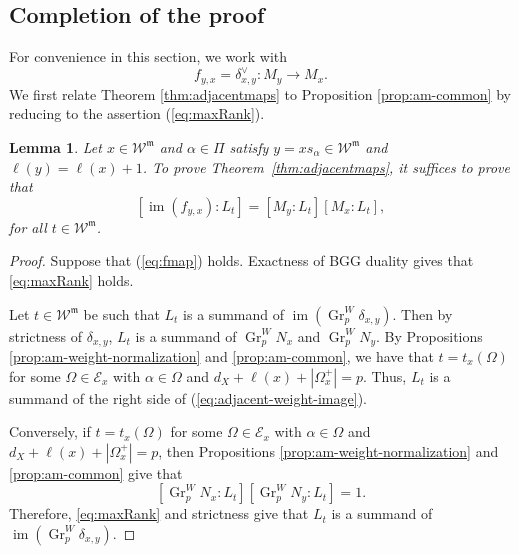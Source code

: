 \documentclass[12pt]{amsart}
\newtheorem{lemma}[theorem]{Lemma}
\theoremstyle{definition}
\numberwithin{equation}{section}
\newcommand{\m}{\mathfrak m}
\newcommand{\W}{\mathscr W}
\begin{document}
\subsection{Completion of the proof} For convenience in this section, we work with
\begin{equation}
f_{y,x}=\delta_{x,y}^{\vee}:M_y\longrightarrow M_x.    
\end{equation}
We first relate Theorem \ref{thm:adjacentmaps} to Proposition \ref{prop:am-common} by reducing to the assertion (\ref{eq:maxRank}).

\begin{lemma}\label{lem:am-weight-reduction}
Let $x\in\W^{\m}$ and $\alpha\in\Pi$ satisfy $y=xs_\alpha\in\W^{\m}$ and $\ell(y)=\ell(x)+1$. To prove Theorem~\ref{thm:adjacentmaps},
it suffices to prove that 
\begin{equation}\label{eq:fmap}
[\operatorname{im}(f_{y,x}): L_t]=[M_y:L_t][M_x:L_t],
\end{equation}
for all $t\in \W^{\m}$.
\end{lemma}

\begin{proof}
Suppose that (\ref{eq:fmap}) holds. Exactness of BGG duality gives that \eqref{eq:maxRank} holds. 

Let $t\in \W^{\m}$ be such that $L_t$ is a summand of $\operatorname{im}(
  \operatorname{Gr}^{W}_{p}\delta_{x,y}
)$. Then by strictness of $\delta_{x,y}$, $L_t$ is a summand of $
  \operatorname{Gr}^{W}_{p}N_x
$ and $
  \operatorname{Gr}^{W}_{p}N_y
$. By Propositions \ref{prop:am-weight-normalization} and \ref{prop:am-common}, we have that $t=t_x(\Omega)$ for some $\Omega\in \mathscr{E}_x$ with $\alpha\in \Omega$ and $d_X+\ell(x)+|\Omega^+_x|=p$. Thus, $L_t$ is a summand of the right side of (\ref{eq:adjacent-weight-image}).

Conversely, if $t=t_x(\Omega)$ for some $\Omega\in \mathscr{E}_x$ with $\alpha\in \Omega$ and $d_X+\ell(x)+|\Omega^+_x|=p$, then Propositions \ref{prop:am-weight-normalization} and \ref{prop:am-common} give that 
\[
[\operatorname{Gr}^{W}_{p}N_x:L_t][\operatorname{Gr}^{W}_{p}N_y:L_t]=1.
\]
Therefore, \eqref{eq:maxRank} and strictness give that $L_t$ is a summand of $\operatorname{im}(
  \operatorname{Gr}^{W}_{p}\delta_{x,y})$.
\end{proof}
\end{document}

